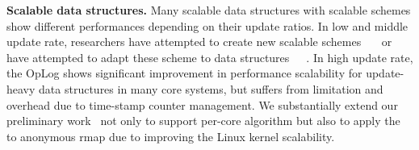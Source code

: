 \noindent
\textbf{Scalable data structures.}
Many scalable data structures with scalable schemes show
different performances depending on their update ratios.
In low and middle update rate, researchers have attempted to create new scalable
schemes~\cite{McKenney98}~\cite{Matveev2015RLU}~\cite{Harris2001Lockfree}
or have attempted to adapt these scheme to data structures~\cite{Arbel2014ConcurrentRCU}~\cite{Dodds2015SCT}~\cite{AustinTClements2012RCUBalancedTrees}.
In high update rate, the OpLog shows significant improvement in
performance scalability for update-heavy data structures in
many core systems, but suffers from limitation and overhead due
to time-stamp counter management.
We substantially extend our preliminary work~\cite{Kyong2016LDU} not only to support 
per-core algorithm but also to apply the \LDU to anonymous rmap due to improving the
Linux kernel scalability.
